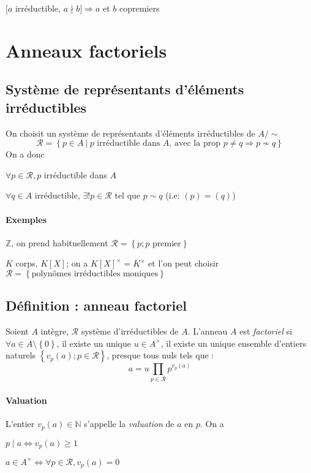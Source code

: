\documentclass[reqno,a4paper,10pt]{report}
\makeatletter
\newcommand{\set}[1]{\left\lbrace #1 \right\rbrace} %
\newcommand{\IZ}{\ensuremath{\mathbb{Z}}\xspace} %
\newcommand{\IN}{\ensuremath{\mathbb{N}}\xspace} %
\newcommand{\so}{\Rightarrow}
\newcommand{\Such}{\ \Big| \ }
\let\olditemize=\itemize%
\renewenvironment{itemize}{%
    \olditemize%
  }{%
    \@noparlisttrue%
    \endlist%
  }%
\makeatother
\begin{document}
$[a$ irréductible, $a \nmid b] \so a$ et $b$ copremiers

\section{Anneaux factoriels}
\subsection{Système de représentants d'éléments irréductibles}
On choisit un système de représentants d'éléments irréductibles de $A/\sim$
\[\mathcal R = \set{p \in A \Such p \text{ irréductible dans }A
\text{, avec la prop } p\neq q \so p\nsim q}\]
On a donc
\begin{itemize}
  \item $\forall p \in \mathcal R, p$ irréductible dans $A$
  \item $\forall q \in A$ irréductible, $\exists ! p \in \mathcal R$ tel que
    $p\sim q$ (i.e: $(p)=(q)$)
\end{itemize}

\paragraph{Exemples}
\begin{itemize}
  \item $\IZ$, on prend habituellement $\mathcal R=\set{p; p\text{ premier}}$
  \item $K$ corps, $K[X]$; on a $K[X]^\times=K^\times$ et l'on peut choisir
    $\mathcal R=\set{\text{polynômes irréductibles moniques}}$
\end{itemize}

\subsection{Définition : anneau factoriel}
Soient $A$ intègre, $\mathcal R$ système d'irréductibles de $A$. L'anneau $A$
est \emph{factoriel} si\\
$\forall a \in A\setminus\set{0}$, il existe un unique $u\in A^\times$, il
existe un unique ensemble d'entiers naturels $\set{v_p(a); p\in \mathcal R}$,
presque tous nuls tels que :
\[a = u \prod_{p\in \mathcal R} p^{v_p(a)}\]

\paragraph{Valuation}
L'entier $v_p(a)\in \IN$ s'appelle la \emph{valuation} de $a$ en $p$. On a
\begin{itemize}
  \item $p\mid a \iff v_p(a)\geq 1$
  \item $a\in A^\times \iff \forall p \in \mathcal R, v_p(a)=0$
\end{itemize}
\end{document}
